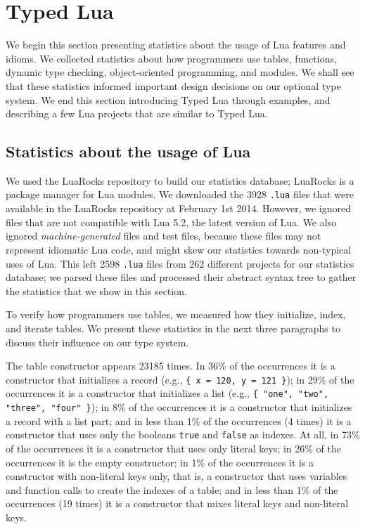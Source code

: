 \documentclass[preprint]{sig-alternate}
\begin{document}
\section{Typed Lua} \label{sec:proposal}

We begin this section presenting statistics about the usage of Lua
features and idioms.
We collected statistics about how programmers use tables, functions,
dynamic type checking, object-oriented programming, and modules.
We shall see that these statistics informed important design decisions
on our optional type system.
We end this section introducing Typed Lua through examples, and
describing a few Lua projects that are similar to Typed Lua. 

\subsection{Statistics about the usage of Lua}

We used the LuaRocks repository to build our statistics database;
LuaRocks \cite{hisham2013luarocks} is a package manager for Lua
modules.
We downloaded the 3928 \verb'.lua' files that were available in
the LuaRocks repository at February 1st 2014.
However, we ignored files that are not compatible with Lua 5.2,
the latest version of Lua.
We also ignored \textit{machine-generated} files and test files,
because these files may not represent idiomatic Lua code,
and might skew our statistics towards non-typical uses of Lua.
This left 2598 \verb'.lua' files from 262 different projects for
our statistics database;
we parsed these files and processed their abstract syntax tree
to gather the statistics that we show in this section.

To verify how programmers use tables, we measured how they
initialize, index, and iterate tables.
We present these statistics in the next three paragraphs to discuss
their influence on our type system.

The table constructor appears 23185 times.
In 36\% of the occurrences it is a constructor that initializes a
record (e.g., \texttt{\{ x = 120, y = 121 \}});
in 29\% of the occurrences it is a constructor that initializes a
list (e.g., \texttt{\{ "one", "two", "three", "four" \}});
in 8\% of the occurrences it is a constructor that initializes a
record with a list part;
and in less than 1\% of the occurrences (4 times) it is a constructor
that uses only the booleans \verb'true' and \verb'false' as indexes.
At all, in 73\% of the occurrences it is a constructor that uses
only literal keys;
in 26\% of the occurrences it is the empty constructor;
in 1\% of the occurrences it is a constructor with non-literal keys
only, that is, a constructor that uses variables and function calls
to create the indexes of a table;
and in less than 1\% of the occurrences (19 times) it is a constructor
that mixes literal keys and non-literal keys.
\end{document}
